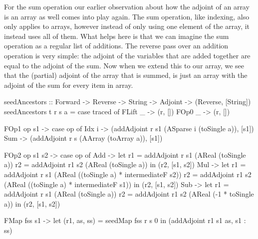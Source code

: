         For the sum operation our earlier observation about how the adjoint of an array is an array as well comes into play again.
        The sum operation, like indexing, also only applies to arrays, however instead of only using one element of the array, it instead uses all of them.
        What helps here is that we can imagine the sum operation as a regular list of additions.
        The reverse pass over an addition operation is very simple: the adjoint of the variables that are added together are equal to the adjoint of the sum.
        Now when we extend this to our array, we see that the (partial) adjoint of the array that is summed, is just an array with the adjoint of the sum for every item in array.

        \begin{haskell}[caption={Function for seeding ancestors of a node. \texttt{seedAncestors} takes in the forward-pass trace, the current reverse pass map, the name of the item to seed the ancestors of, and the adjoint of that item to seed its ancestors with; and outputs a tuple containing an updated reverse pass, and a list of strings of items to evaluate to add to the reverse pass queue.}, label=lst:seedanc, gobble=12]
            seedAncestors :: Forward -> Reverse -> String -> Adjoint -> (Reverse, [String])
            seedAncestors t r s a = case traced of
                FLift _        -> (r, [])
                FOp0  _        -> (r, [])

                FOp1  op s1    -> case op of
                    Idx i -> (addAdjoint r s1 (ASparse i (toSingle a)), [s1])
                    Sum   -> (addAdjoint r s (AArray (toArray a)), [s1])
                
                FOp2  op s1 s2 -> case op of
                    Add -> 
                        let r1 = addAdjoint r  s1 (AReal (toSingle a))
                            r2 = addAdjoint r1 s2 (AReal (toSingle a))
                        in  (r2, [s1, s2])
                    Mul ->
                        let r1 = addAdjoint r  s1 (AReal ((toSingle a) * intermediateF s2))
                            r2 = addAdjoint r1 s2 (AReal ((toSingle a) * intermediateF s1))
                        in  (r2, [s1, s2])
                    Sub ->
                        let r1 = addAdjoint r  s1 (AReal (toSingle a))
                            r2 = addAdjoint r1 s2 (AReal (-1 * toSingle a))
                        in  (r2, [s1, s2])
                
                FMap  fss s1   ->
                    let (r1, as, ss) = seedMap fss r s 0
                    in  (addAdjoint r1 s1 as, s1 : ss)
                

\end{haskell}
